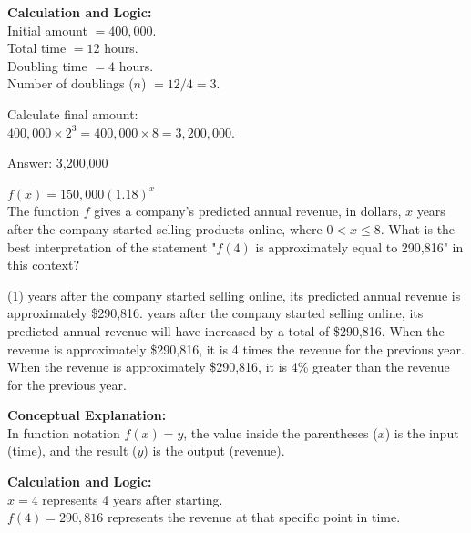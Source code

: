 \documentclass[11pt,paper=a4,answers]{exam}
\begin{document}
\begin{questions}
\begin{solution}
\textbf{Calculation and Logic:} \\
Initial amount $= 400,000$. \\
Total time $= 12$ hours. \\
Doubling time $= 4$ hours. \\
Number of doublings ($n$) $= 12 / 4 = 3$.

\vspace{10pt}

Calculate final amount: \\
$400,000 \times 2^3 = 400,000 \times 8 = 3,200,000$.

\vspace{25pt}

Answer: \colorbox{yellow!100}{3,200,000}
\end{solution}

\vspace{40pt}

\question
$f(x) = 150,000(1.18)^x$ \\
The function $f$ gives a company's predicted annual revenue, in dollars, $x$ years after the company started selling products online, where $0 < x \leq 8$. What is the best interpretation of the statement "$f(4)$ is approximately equal to 290,816" in this context?
\begin{tasks}(1)
     years after the company started selling online, its predicted annual revenue is approximately \$290,816.
     years after the company started selling online, its predicted annual revenue will have increased by a total of \$290,816.
    \task When the revenue is approximately \$290,816, it is 4 times the revenue for the previous year.
    \task When the revenue is approximately \$290,816, it is 4\% greater than the revenue for the previous year.
\end{tasks}

\begin{solution}
\textbf{Conceptual Explanation:} \\
In function notation $f(x) = y$, the value inside the parentheses ($x$) is the input (time), and the result ($y$) is the output (revenue).

\vspace{20pt}

\textbf{Calculation and Logic:} \\
$x = 4$ represents 4 years after starting. \\
$f(4) = 290,816$ represents the revenue at that specific point in time.


\end{solution}
\end{questions}
\end{document}
